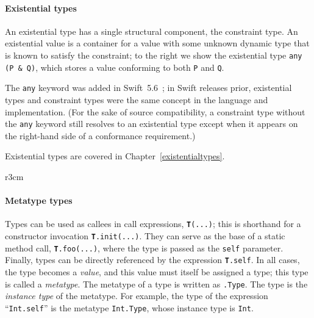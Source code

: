 \documentclass[../generics]{subfiles}
\begin{document}
\paragraph{Existential types}
An existential type has a single structural component, the constraint type. An existential value is a container for a value with some unknown dynamic type that is known to satisfy the constraint; to the right we show the existential type \verb|any (P & Q)|, which stores a value conforming to both \texttt{P} and \texttt{Q}.

The \texttt{any} keyword was added in Swift~5.6~\cite{se0355}; in Swift releases prior, existential types and constraint types were the same concept in the language and implementation. (For the sake of source compatibility, a constraint type without the \texttt{any} keyword still resolves to an existential type except when it appears on the right-hand side of a conformance requirement.)

Existential types are covered in Chapter~\ref{existentialtypes}.

\begin{wrapfigure}[9]{r}{3cm}
\end{wrapfigure}

\paragraph{Metatype types} Types can be used as callees in call expressions, \texttt{\textbf{T}(...)}; this is shorthand for a constructor invocation \texttt{\textbf{T}.init(...)}. They can serve as the base of a static method call, \texttt{\textbf{T}.foo(...)}, where the type is passed as the \texttt{self} parameter. Finally, types can be directly referenced by the expression \texttt{\textbf{T}.self}. In all cases, the type becomes a \emph{value}, and this value must itself be assigned a type; this type is called a \emph{metatype}. The metatype of a type  is written as \texttt{.Type}. The type  is the \emph{instance type} of the metatype. For example, the type of the expression ``\verb|Int.self|'' is the metatype \texttt{Int.Type}, whose instance type is \verb|Int|.
\end{document}
